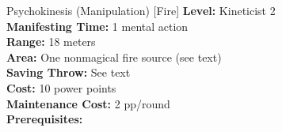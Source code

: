 {Psychokinesis (Manipulation) [Fire]}
{
	\textbf{Level:}
	Kineticist 2\\
	\textbf{Manifesting Time:}
	1 mental action\\
	\textbf{Range:}
	18 meters\\
	\textbf{Area:}
	One nonmagical fire source (see text)\\
	\textbf{Saving Throw:}
	See text\\
	\textbf{Cost:}
	10 power points\\
	\textbf{Maintenance Cost:}
	2 pp/round\\
	\textbf{Prerequisites:}
	\\
}
